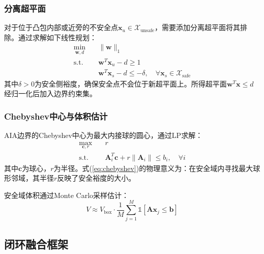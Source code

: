 \documentclass[a4paper,11pt]{ctexart}
\newcommand{\bx}{\mathbf{x}}
\newcommand{\bA}{\mathbf{A}}
\newcommand{\bb}{\mathbf{b}}
\newcommand{\bw}{\mathbf{w}}
\begin{document}
\subsubsection{分离超平面}

对于位于凸包内部或近旁的不安全点$\bx_u \in \mathcal{X}_{\text{unsafe}}$，需要添加分离超平面将其排除。通过求解如下线性规划：
\begin{equation}
    \begin{aligned}
        \min_{\bw, d} \quad & \|\bw\|_1 \\
        \text{s.t.} \quad & \bw^T \bx_u - d \geq 1 \\
        & \bw^T \bx_s - d \leq -\delta, \quad \forall \bx_s \in \mathcal{X}_{\text{safe}}
    \end{aligned}
    \label{eq:separating_hp}
\end{equation}
其中$\delta > 0$为安全侧裕度，确保安全点不会位于新超平面上。所得超平面$\bw^T \bx \leq d$经归一化后加入边界约束集。

\subsubsection{Chebyshev中心与体积估计}

AIA边界的Chebyshev中心为最大内接球的圆心，通过LP求解：
\begin{equation}
    \begin{aligned}
        \max_{\mathbf{c}, r} \quad & r \\
        \text{s.t.} \quad & \bA_i^T \mathbf{c} + r \|\bA_i\| \leq b_i, \quad \forall i
    \end{aligned}
    \label{eq:chebyshev}
\end{equation}
其中$\mathbf{c}$为球心，$r$为半径。式(\ref{eq:chebyshev})的物理意义为：在安全域内寻找最大球形邻域，其半径$r$反映了安全裕度的大小。

安全域体积通过Monte Carlo采样估计：
\begin{equation}
    V \approx V_{\text{box}} \cdot \frac{1}{M} \sum_{j=1}^M \mathbb{1}[\bA \bx_j \leq \bb]
    \label{eq:volume}
\end{equation}

\subsection{闭环融合框架}
\label{subsec:closed_loop}
\end{document}
